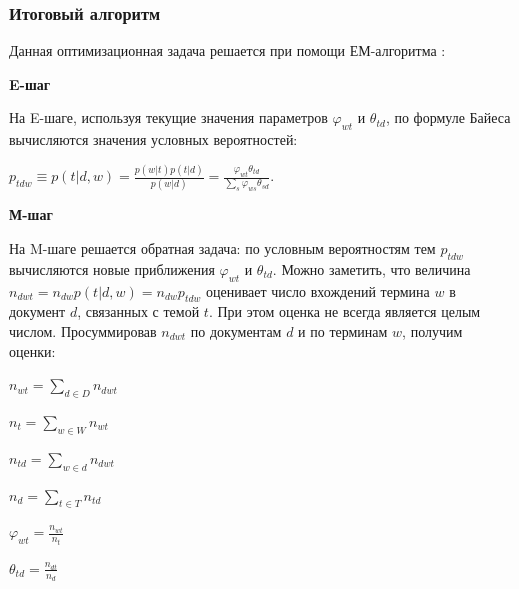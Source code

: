 \documentclass[12pt]{article}
\renewcommand{\phi}{\varphi}
\begin{document}
\subsubsection{Итоговый алгоритм}

Данная оптимизационная задача решается при помощи ЕМ-алгоритма \cite{hofmann1999probabilistic}:

\noindent\textbf{E-шаг}

На E-шаге, используя текущие значения параметров $\phi_{wt}$ и $\theta_{td}$, по формуле Байеса вычисляются значения условных вероятностей:

$p_{tdw} \equiv p(t|d,w) = \frac {p(w|t)p(t|d)} {p(w|d)} = \frac {\varphi_{wt}\theta_{td}} {\sum_s\varphi_{ws}\theta_{sd}}$.

\noindent\textbf{М-шаг}

На M-шаге решается обратная задача: по условным вероятностям тем $p_{tdw}$ вычисляются новые приближения $\phi_{wt}$ и $\theta_{td}$.
Можно заметить, что величина $n_{dwt}=n_{dw}p(t|d,w)=n_{dw}p_{tdw}$ оценивает число вхождений термина $w$ в документ $d$, связанных с темой $t$. При этом оценка не всегда является целым числом. Просуммировав $n_{dwt}$ по документам $d$ и по терминам $w$, получим оценки:

$n_{wt}=\sum_{d \in D} n_{dwt}$

$n_t = \sum_{w \in W}n_{wt}$

$n_{td}=\sum_{w \in d} n_{dwt}$

$n_d = \sum_{t \in T}n_{td}$

$\phi_{wt}=\frac{n_{wt}}{n_t}$

$\theta_{td} = \frac{n_{dt}}{n_{d}}$
\end{document}
